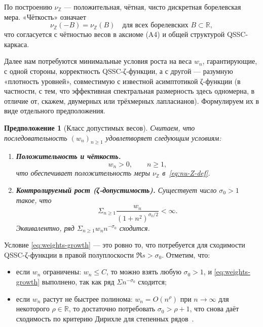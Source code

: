 \documentclass{article}
\numberwithin{equation}{section}
\theoremstyle{plain}
\newtheorem{assumption}{Предположение}[section]
\theoremstyle{definition}
\theoremstyle{remark}
\def\rho{ρ}\def\sigma{σ}\def\Sigma{Σ}\def\tau{τ}%
\def\infty{∞}\def\partial{∂}\def\sum{Σ}\def\int{∫}%
\begin{document}
\noindent
По построению \(\nu_{\mathbb Z}\) — положительная, чётная, чисто дискретная
борелевская мера. «Чёткость» означает
\begin{equation}
\label{eq:nu-Z-even}
\nu_{\mathbb Z}(-B)=\nu_{\mathbb Z}(B)
\quad\text{для всех борелевских }B\subset\mathbb R,
\end{equation}
что согласуется с чётностью весов в аксиоме \textup{(A4)} и общей структурой
QSSC-каркаса.

\medskip

Далее нам потребуются минимальные условия роста на веса \(w_n\),
гарантирующие, с одной стороны, корректность QSSC-ζ-функции, а с другой —
разумную «плотность уровней», совместимую с известной асимптотикой ζ-функции
(в частности, с тем, что эффективная спектральная размерность здесь одномерна,
в отличие от, скажем, двумерных или трёхмерных лапласианов). Формулируем их
в виде отдельного предположения.

\begin{assumption}[Класс допустимых весов]
\label{ass:weights}
Считаем, что последовательность \((w_n)_{n\ge 1}\) удовлетворяет следующим
условиям:
\begin{enumerate}[label=(W\arabic*), leftmargin=2.3em]
  \item \textbf{Положительность и чёткость.}
  \begin{equation}
  \label{eq:weights-pos}
  w_n>0,\qquad n\ge 1,
  \end{equation}
  что обеспечивает положительность меры
  \(\nu_{\mathbb Z}\) в~\eqref{eq:nu-Z-def}.

  \item \textbf{Контролируемый рост (ζ-допустимость).}  
  Существует число \(\sigma_0>1\) такое, что
  \begin{equation}
  \label{eq:weights-growth}
  \sum_{n\ge 1} \frac{w_n}{(1+n^2)^{\sigma_0/2}}
  <\infty.
  \end{equation}
  Эквивалентно, ряд
  \(\sum_{n\ge 1} w_n n^{-\sigma_0}\) сходится.
\end{enumerate}
\end{assumption}

\noindent
Условие \eqref{eq:weights-growth} — это ровно то, что потребуется для
сходимости QSSC-ζ-функции в правой полуплоскости \(\Re s>\sigma_0\).
Отметим, что:

\begin{itemize}[leftmargin=2.2em]
  \item если \(w_n\) ограничены: \(w_n\le C\), то можно взять любую
  \(\sigma_0>1\), и \eqref{eq:weights-growth} выполнено, так как ряд
  \(\sum n^{-\sigma_0}\) сходится;

  \item если \(w_n\) растут не быстрее полинома: \(w_n=O(n^\rho)\) при
  \(n\to\infty\) для некоторого \(\rho\in\mathbb R\), то достаточно потребовать
  \(\sigma_0>\rho+1\), что снова даёт сходимость по критерию Дирихле
  для степенных рядов~\cite{Hardy1999}.
\end{itemize}
\end{document}
